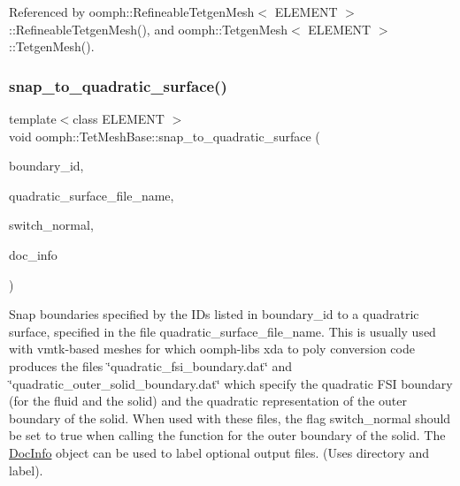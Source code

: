 Referenced by oomph\+::\+Refineable\+Tetgen\+Mesh$<$ E\+L\+E\+M\+E\+N\+T $>$\+::\+Refineable\+Tetgen\+Mesh(), and oomph\+::\+Tetgen\+Mesh$<$ E\+L\+E\+M\+E\+N\+T $>$\+::\+Tetgen\+Mesh().

\mbox{\label{classoomph_1_1TetMeshBase_a170ad79a306435b4a6ed828f6b5739ff}} 
\subsubsection{\texorpdfstring{snap\+\_\+to\+\_\+quadratic\+\_\+surface()}{snap\_to\_quadratic\_surface()}\hspace{0.1cm}{\footnotesize\ttfamily [1/2]}}
{\footnotesize\ttfamily template$<$class E\+L\+E\+M\+E\+NT $>$ \\
void oomph\+::\+Tet\+Mesh\+Base\+::snap\+\_\+to\+\_\+quadratic\+\_\+surface (\begin{DoxyParamCaption}\item[{const \hyperlink{classoomph_1_1Vector}{Vector}$<$ unsigned $>$ \&}]{boundary\+\_\+id,  }\item[{const std\+::string \&}]{quadratic\+\_\+surface\+\_\+file\+\_\+name,  }\item[{const bool \&}]{switch\+\_\+normal,  }\item[{\hyperlink{classoomph_1_1DocInfo}{Doc\+Info} \&}]{doc\+\_\+info }\end{DoxyParamCaption})}



Snap boundaries specified by the I\+Ds listed in boundary\+\_\+id to a quadratric surface, specified in the file quadratic\+\_\+surface\+\_\+file\+\_\+name. This is usually used with vmtk-\/based meshes for which oomph-\/lib\textquotesingle{}s xda to poly conversion code produces the files \char`\"{}quadratic\+\_\+fsi\+\_\+boundary.\+dat\char`\"{} and \char`\"{}quadratic\+\_\+outer\+\_\+solid\+\_\+boundary.\+dat\char`\"{} which specify the quadratic F\+SI boundary (for the fluid and the solid) and the quadratic representation of the outer boundary of the solid. When used with these files, the flag switch\+\_\+normal should be set to true when calling the function for the outer boundary of the solid. The \hyperlink{classoomph_1_1DocInfo}{Doc\+Info} object can be used to label optional output files. (Uses directory and label). 

